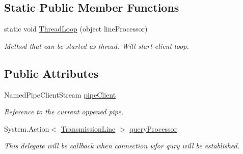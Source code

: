 \subsection*{Static Public Member Functions}
\begin{DoxyCompactItemize}
\item 
static void \mbox{\hyperlink{class_pipes_provider_1_1_transmission_line_ab56219b10bad03085b5d23e48ad59ec3}{Thread\+Loop}} (object line\+Processor)
\begin{DoxyCompactList}\small\item\em Method that can be started as thread. Will start client loop. \end{DoxyCompactList}\end{DoxyCompactItemize}
\subsection*{Public Attributes}
\begin{DoxyCompactItemize}
\item 
Named\+Pipe\+Client\+Stream \mbox{\hyperlink{class_pipes_provider_1_1_transmission_line_a31dff9b14126dc47bfafe65e3c976c2f}{pipe\+Client}}
\begin{DoxyCompactList}\small\item\em Reference to the current oppened pipe. \end{DoxyCompactList}\item 
System.\+Action$<$ \mbox{\hyperlink{class_pipes_provider_1_1_transmission_line}{Transmission\+Line}} $>$ \mbox{\hyperlink{class_pipes_provider_1_1_transmission_line_a08bf6cb803ea32dd416afcc12ee866f5}{query\+Processor}}
\begin{DoxyCompactList}\small\item\em This delegate will be callback when connection wfor qury will be established. \end{DoxyCompactList}\end{DoxyCompactItemize}
